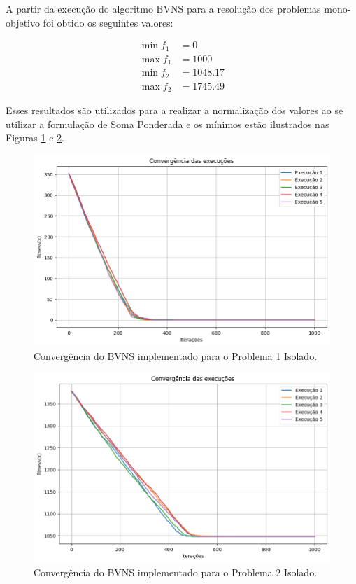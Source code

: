 \documentclass[conference]{IEEEtran}
\begin{document}
A partir da execução do algoritmo BVNS para a resolução dos problemas mono-objetivo foi obtido
os seguintes valores:

\begin{align}
\min f_1 &= 0 \\
\max f_1 &= 1000 \\
\min f_2 &= 1048.17 \\
\max f_2 &= 1745.49
\end{align}

Esses resultados são utilizados para a realizar a normalização dos valores ao se utilizar a formulação de Soma Ponderada e os mínimos estão ilustrados nas Figuras \ref{fig:convergencia_execucoes_p1} e \ref{fig:convergencia_execucoes_p2}.

\begin{figure}[htbp]
    \centering
    \includegraphics[width=\columnwidth,trim=1 1 1 1,clip]{convergencia_execucoes_p1.png}
    \caption{\label{fig:convergencia_execucoes_p1}Convergência do BVNS implementado para o Problema 1 Isolado.}
\end{figure}

\begin{figure}[htbp]
    \centering
    \includegraphics[width=\columnwidth,trim=1 1 1 1,clip]{convergencia_execucoes.png}
    \caption{\label{fig:convergencia_execucoes_p2}Convergência do BVNS implementado para o Problema 2 Isolado.}
\end{figure}
\end{document}
